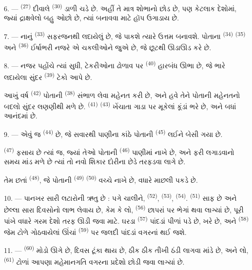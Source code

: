 \VUsaut{6.0mm}
\VUsaut{3.4mm}

6. ---  \textsuperscript{(27)} દીવાલે 
\textsuperscript{(30)} ડાળી ચડે છે. અહીં તે માત્ર શોભાનો છોડ છે, પણ
કેટલાક દેશોમાં, જ્યાં દ્રાક્ષવેલો બહુ ઓછો છે, ત્યાં 
બનાવવા માટે હૉપ ઉગાડાય છે.

7. --- નાનું  \textsuperscript{(33)} સફરજનથી
લદાયેલું છે, જે પાકશે ત્યારે ઉત્તમ  બનાવશે. પોતાના
 \textsuperscript{(34)} 
\textsuperscript{(35)} અને  \textsuperscript{(36)}
ઈર્ષાભરી નજરે એ ચકલીઓને જુએ છે, જે છૂટથી ઊડાઊડ કરે છે.

8. --- નજર પહોંચે ત્યાં સુધી, ટેકરીઓના ઢોળાવ પર 
\textsuperscript{(40)} હારબંધ ઊભા છે, જે ભારે 
લદાયેલા સુંદર  \textsuperscript{(39)} ટેકો આપે છે.

આખું વર્ષ  \textsuperscript{(42)} પોતાની
 \textsuperscript{(38)} સંભાળ લેવા મહેનત કરી છે,
અને હવે તેને પોતાની મહેનતનો બદલો સુંદર લણણીથી મળે છે.  \textsuperscript{(41)} 
\textsuperscript{(43)} ખેંચાતા ગાડા પર મૂકેલાં કૂંડાં ભરે છે, અને બધાં
આનંદમાં છે.

\VUsaut{5.0mm}
\VUsaut{3.4mm}

9. --- એવું જ  \textsuperscript{(44)}
છે, જે સવારથી પાણીના કાંઠે પોતાની 
\textsuperscript{(45)} લઈને બેસી ગયા છે.

 \textsuperscript{(47)}  ફસાય છે ત્યાં જ,
જ્યાં તેઓ પોતાની  \textsuperscript{(46)} પાણીમાં નાખે છે,
અને  ફરી લગાડવાનો સમય માંડ મળે છે ત્યાં તો નવો શિકાર
દોરીના છેડે તરફડવા લાગે છે.

તેમ છતાં  \textsuperscript{(48)}, જે પોતાની
 \textsuperscript{(49)} 
 \textsuperscript{(50)} વચ્ચે નાખે છે, વધારે માછલી પકડે છે.

10. --- પાનખર સારી લટારોની ઋતુ છે : પગે ચાલીને, 
\textsuperscript{(52)},  \textsuperscript{(53)},
 \textsuperscript{(54)}. 
\textsuperscript{(51)} સાફ છે અને છેલ્લા સારા દિવસોનો લાભ લેવાય છે, કેમ
કે લો,  \textsuperscript{(56)} છાપરાં પર ભેગાં થવા
લાગ્યાં છે, પૂરી પાંખે વધારે ગરમ દેશો તરફ ઊડી જવા માટે. ઘરડા
 \textsuperscript{(57)} પાંદડાં પીળાં પડે છે,
 ખરે છે, અને  \textsuperscript{(58)} જેમ
ટોળે ગોઠવાયેલાં ઊંચાં  
\textsuperscript{(59)} પર જલદી પાંદડાં વગરનાં થઈ જશે.

11. ---  \textsuperscript{(60)} મોડો ઊગે છે, દિવસ ટૂંકા
થાય છે,  ઠીક ઠીક તીખી ઠંડી લાગવા માંડે છે, અને લો,
 \textsuperscript{(61)} ટોળાં આપણા મહેમાનગતિ વગરના
પ્રદેશો છોડી જવા લાગ્યાં છે.

\VUsaut{6.0mm}
\VUfilet{22mm}
